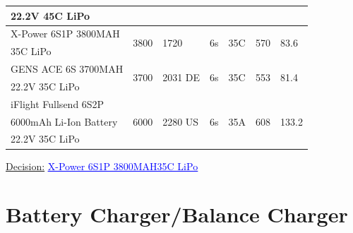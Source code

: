 \begin{table}[H]
\begin{center}
\begin{tabular}{|lllllll|}
				22.2V 45C LiPo                            &                                 &                               &                           &                               &               &         \\ \hline
				X-Power 6S1P 3800MAH & \multirow{2}{*}{3800}           & \multirow{2}{*}{1720}         & \multirow{2}{*}{6s}       & \multirow{2}{*}{35C}          & \multirow{2}{*}{570}    &  \multirow{2}{*}{83.6}             \\
				35C LiPo                            &                                 &                               &                           &                               &               &         \\ \hline
				GENS ACE 6S 3700MAH & \multirow{2}{*}{3700}           & \multirow{2}{*}{2031 DE}         & \multirow{2}{*}{6s}       & \multirow{2}{*}{35C}          & \multirow{2}{*}{553}    &  \multirow{2}{*}{81.4}             \\
				22.2V 35C LiPo                            &                                 &                               &                           &                               &               &         \\ \hline
				iFlight Fullsend 6S2P & \multirow{3}{*}{6000}           & \multirow{3}{*}{2280 US}         & \multirow{3}{*}{6s}       & \multirow{3}{*}{35A}          & \multirow{3}{*}{608}    &  \multirow{3}{*}{133.2}             \\
				6000mAh Li-Ion Battery                    &                                 &                               &                           &                               &               &         \\
				22.2V 35C LiPo                            &                                 &                               &                           &                               &               &         \\ \hline
				\end{tabular}
		\end{center}
	\end{table}

\underline{Decision:}
\href{https://cmchobbies.co.za/shop/batteries-and-chargers/lipo-lithium-polymer/lipo-6s-6cell/xpower-lipo-3800mah-6s-35c}{\textcolor{blue}{\underline{X-Power 6S1P 3800MAH35C LiPo}}}

	


\section{Battery Charger/Balance Charger}


